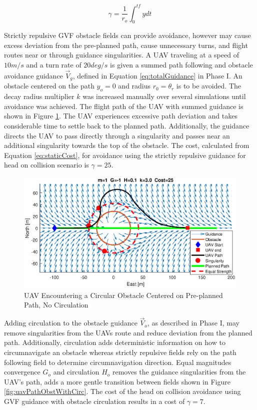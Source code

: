 \documentclass[numbered,pdftex]{ohio-etd}
\begin{document}
 \begin{equation}
 \label{eq:staticCost}
 \gamma = \frac{1}{r_o}\int_{0}^{tf}ydt
 \end{equation}
 
 
 Strictly repulsive GVF obstacle fields can provide avoidance, however may cause excess deviation from the pre-planned path, cause unnecessary turns, and flight routes near or through guidance singularities. A UAV traveling at a speed of $10m/s$ and a turn rate of $20 deg/s$ is given a summed path following and obstacle avoidance guidance $\overrightarrow{V}_g$, defined in Equation \ref{eq:totalGuidance} in Phase I. An obstacle centered on the path $y_o=0$ and radius $r_0 = \theta_r$ is to be avoided. The decay radius multiplier $k$ was increased manually over several simulations until avoidance was achieved. The flight path of the UAV with summed guidance is shown in Figure \ref{fig:uavPathObstNoCirc}. The UAV experiences excessive path deviation and takes considerable time to settle back to the planned path. Additionally, the guidance directs the UAV to pass directly through a singularity and passes near an additional singularity towards the top of the obstacle. The cost, calculated from Equation \ref{eq:staticCost}, for avoidance using the strictly repulsive guidance for head on collision scenario is $\gamma=25$.
 

\begin{figure}[H]
	\centering
	\includegraphics[trim=0 85 0 85,clip,width=15cm]{PaperFigures/Methods/bruteForceSolveN1V10}
	\caption{UAV Encountering a Circular Obstacle Centered on Pre-planned Path, No Circulation}
	\label{fig:uavPathObstNoCirc}
\end{figure}

Adding circulation to the obstacle guidance $\overrightarrow{V}_o$, as described in Phase I, may remove singularities from the UAVs route and reduce deviation from the planned path. Additionally, circulation adds deterministic information on how to circumnavigate an obstacle whereas strictly repulsive fields rely on the path following field to determine circumnavigation direction. Equal magnitudes convergence $G_o$ and circulation $H_o$ removes the guidance singularities from the UAV's path, adds a more gentle transition between fields shown in Figure \ref{fig:uavPathObstWithCirc}. The cost of the head on collision avoidance using GVF guidance with obstacle circulation results in a cost of $\gamma=7$.
\end{document}
